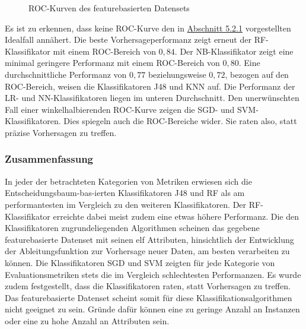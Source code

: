 \begin{figure}[h!t]
  \caption{ROC-Kurven des featurebasierten Datensets \label{fig:roc-feat}}
\end{figure}

Es ist zu erkennen, dass keine ROC-Kurve den in \hyperref[roc-def]{Abschnitt 5.2.1} vorgestellten Idealfall annähert. Die beste Vorhersageperformanz zeigt erneut der RF-Klassifikator mit einem ROC-Bereich von $0,84$. Der NB-Klassifikator zeigt eine minimal geringere Performanz mit einem ROC-Bereich von $0,80$. Eine durchschnittliche Performanz von $0,77$ beziehungsweise $0,72$, bezogen auf den ROC-Bereich, weisen die Klassifikatoren J48 und KNN auf. Die Performanz der LR- und NN-Klassifikatoren liegen im unteren Durchschnitt. Den unerwünschten Fall einer winkelhalbierenden ROC-Kurve zeigen die SGD- und SVM-Klassifikatoren. Dies spiegeln auch die ROC-Bereiche wider. Sie \glqq raten\grqq{} also, statt präzise Vorhersagen zu treffen.

\subsubsection*{Zusammenfassung}
In jeder der betrachteten Kategorien von Metriken erwiesen sich die Entscheidungsbaum-bas-ierten Klassifikatoren J48 und RF als am performantesten im Vergleich zu den weiteren Klassifikatoren. Der RF-Klassifikator erreichte dabei meist zudem eine etwas höhere Performanz. Die den Klassifikatoren zugrundeliegenden Algorithmen scheinen das gegebene featurebasierte Datenset mit seinen elf Attributen, hinsichtlich der Entwicklung der Ableitungsfunktion zur Vorhersage neuer Daten, am besten verarbeiten zu können.
Die Klassifikatoren SGD und SVM zeigten für jede Kategorie von Evaluationsmetriken stets die im Vergleich schlechtesten Performanzen. Es wurde zudem festgestellt, dass die Klassifikatoren raten, statt Vorhersagen zu treffen. Das featurebasierte Datenset scheint somit für diese Klassifikationsalgorithmen nicht geeignet zu sein. Gründe dafür können eine zu geringe Anzahl an Instanzen oder eine zu hohe Anzahl an Attributen sein.

